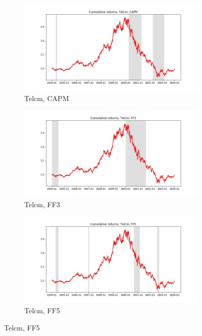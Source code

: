 \documentclass{article}
\begin{document}
  \begin{figure}
  \centering
  \begin{subfigure}[b]{0.3\textwidth}
    \centering
    \includegraphics[width=\textwidth]{Telcm/full_cumrets_ofint_CAPM.jpg}
    \caption{Telcm, CAPM}
    \label{fig:1}
  \end{subfigure}
  \begin{subfigure}[b]{0.3\textwidth}
    \centering
    \includegraphics[width=\textwidth]{Telcm/full_cumrets_ofint_FF3.jpg}
    \caption{Telcm, FF3}
    \label{fig:2}
  \end{subfigure}
    \begin{subfigure}[b]{0.3\textwidth}
    \centering
    \includegraphics[width=\textwidth]{Telcm/full_cumrets_ofint_FF5.jpg}
    \caption{Telcm, FF5}
    \label{fig:1}
  \end{subfigure}
  \end{figure}
  
\end{document}
